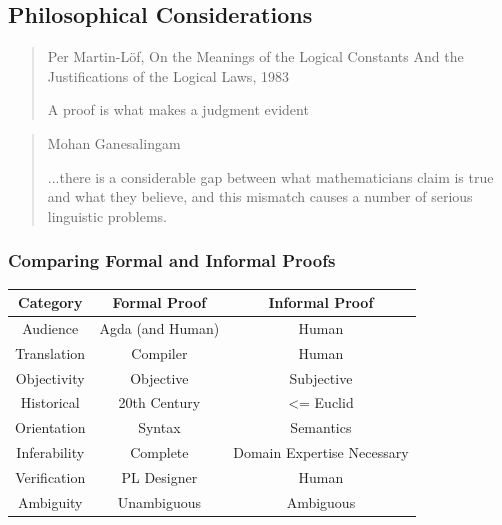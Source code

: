 \documentclass[10pt]{beamer}
\begin{document}
\subsection{Philosophical Considerations}

\begin{frame}

\begin{quote}{Per Martin-Löf, On the Meanings of the Logical Constants And the
    Justifications of the Logical Laws, 1983}

A proof is what makes a judgment evident %

\end{quote}


\end{frame}


\begin{frame}
\begin{quote}{Mohan Ganesalingam}

...there is a considerable gap between what mathematicians claim is true and what
they believe, and this mismatch causes a number of serious linguistic problems.

\end{quote}
\end{frame}


\begin{frame}

\frametitle{Comparing Formal and Informal Proofs}


\centering




\begin{tabular}{|c|c|c|} \hline
  Category & Formal Proof & Informal Proof \\ \hline
  Audience & Agda (and Human) & Human \\ \hline
  Translation & Compiler & Human \\ \hline
  Objectivity & Objective & Subjective \\ \hline %
  Historical & 20th Century & <= Euclid \\ \hline
  Orientation & Syntax & Semantics \\ \hline
  Inferability & Complete & Domain Expertise Necessary \\ \hline
  Verification & PL Designer & Human \\ \hline
  Ambiguity & Unambiguous & Ambiguous \\ \hline

\end{tabular}


\end{frame}
\end{document}
